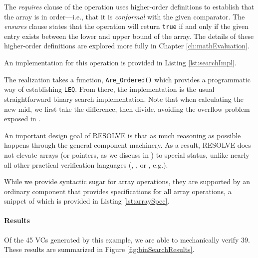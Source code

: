 The \emph{requires} clause of the operation uses higher-order definitions to establish that the array is in order---i.e., that it is \emph{conformal} with the given comparator.  The \emph{ensures} clause states that the operation will return \texttt{true} if and only if the given entry exists between the lower and upper bound of the array.  The details of these higher-order definitions are explored more fully in Chapter \ref{ch:mathEvaluation}.

An implementation for this operation is provided in Listing \ref{lst:searchImpl}.



The realization takes a function, \texttt{Are\_Ordered()} which provides a programmatic way of establishing \texttt{LEQ}.  From there, the implementation is the usual straightforward binary search implementation.  Note that when calculating the new mid, we first take the difference, then divide, avoiding the overflow problem exposed in \cite{blochBinarySearch}.

An important design goal of RESOLVE is that as much reasoning as possible happens through the general component machinery.  As a result, RESOLVE does not elevate arrays (or pointers, as we discuss in \cite{kulczyckiPointers}) to special status, unlike nearly all other practical verification languages (\cite{DafnyOverview}, \cite{cok:esc}, or \cite{kuncakJahobOverview}, e.g.).

While we provide syntactic sugar for array operations, they are supported by an ordinary component that provides specifications for all array operations, a snippet of which is provided in Listing \ref{lst:arraySpec}.

\FloatBarrier


\paragraph{Results} Of the 45 VCs generated by this example, we are able to mechanically verify 39.  These results are summarized in Figure \ref{fig:binSearchResults}.

